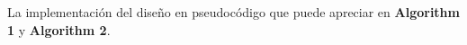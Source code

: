 \documentclass[a4paper]{article}
\begin{document}
La implementación del diseño en pseudocódigo que puede apreciar en \textbf{Algorithm 1} y \textbf{Algorithm 2}.
\end{document}
